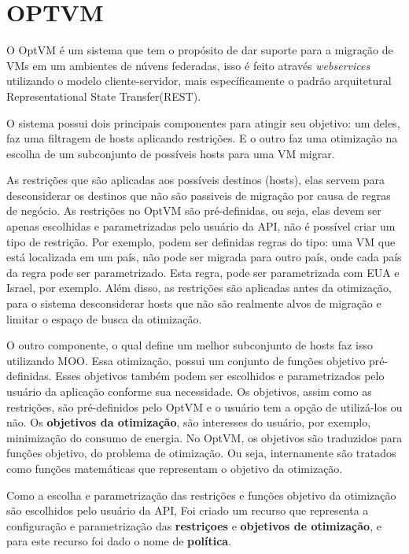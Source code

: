 \chapter{OPTVM}

O OptVM é um sistema que tem o propósito de dar suporte para a migração de VMs em um ambientes de núvens federadas,
isso é feito através \textit{webservices} utilizando o modelo cliente-servidor, mais específicamente o padrão arquitetural 
Representational State Transfer(REST).

O sistema possui dois principais componentes para atingir seu objetivo: um deles, faz uma filtragem de hosts aplicando 
restrições. E o outro faz uma otimização na escolha de um subconjunto de possíveis hosts para uma VM migrar. 

As restrições que são aplicadas aos possíveis destinos (hosts), elas servem para desconsiderar os destinos 
que não são passiveis de migração por causa de regras de negócio. As restrições no 
OptVM são pré-definidas, ou seja, elas devem ser apenas escolhidas e parametrizadas pelo 
usuário da API, não é possível criar um tipo de restrição. Por exemplo, podem ser definidas regras do tipo: 
uma VM que está localizada em um país, não pode ser migrada para outro país, onde cada país
da regra pode ser parametrizado. Esta regra, pode ser parametrizada com EUA e Israel, por exemplo.
Além disso, as restrições são aplicadas antes da otimização, para o sistema desconsiderar hosts que
não são realmente alvos de migração e limitar o espaço de busca da otimização.

O outro componente, o qual define um melhor subconjunto de hosts faz isso utilizando MOO. Essa
otimização, possui um conjunto de funções objetivo pré-definidas. Esses objetivos também podem ser escolhidos
e parametrizados pelo usuário da aplicação conforme sua necessidade. Os objetivos,
assim como as restrições, são pré-definidos pelo OptVM e o usuário tem a opção de utilizá-los ou não.
Os \textbf{objetivos da otimização}, são interesses do usuário, por exemplo, minimização do consumo de energia.
No OptVM, os objetivos são traduzidos para funções objetivo, do problema de otimização. Ou seja, internamente são tratados
como funções matemáticas que representam o objetivo da otimização.

Como a escolha e parametrização das restrições e funções objetivo da otimização são escolhidos pelo usuário da API,
Foi criado um recurso que representa a configuração e parametrização das \textbf{restriçoes} e \textbf{objetivos de otimização},
e para este recurso foi dado o nome de \textbf{política}. 

